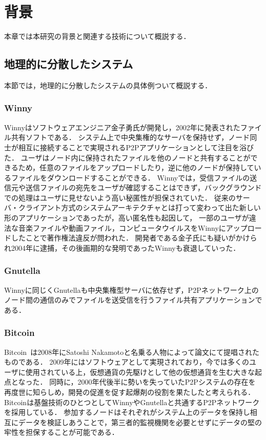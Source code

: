 \chapter{背景}
\label{background}

本章では本研究の背景と関連する技術について概説する．

\section{地理的に分散したシステム}
\label{background:geographically-disdtributed-system}
本節では，地理的に分散したシステムの具体例ついて概説する．

\subsection{Winny}
Winnyはソフトウェアエンジニア金子勇氏が開発し，2002年に発表されたファイル共有ソフトである．
システム上で中央集権的なサーバを保持せず，ノード同士が相互に接続することで実現されるP2Pアプリケーションとして注目を浴びた．
ユーザはノード内に保持されたファイルを他のノードと共有することができるため，任意のファイルをアップロードしたり，逆に他のノードが保持しているファイルをダウンロードすることができる．
Winnyでは，受信ファイルの送信元や送信ファイルの宛先をユーザが確認することはできず，バックグラウンドでの処理はユーザに見せないよう高い秘匿性が担保されていた．
従来のサーバ・クライアント方式のシステムアーキテクチャとは打って変わって出た新しい形のアプリケーションであったが，高い匿名性も起因して，
一部のユーザが違法な音楽ファイルや動画ファイル，コンピュータウイルスをWinnyにアップロードしたことで著作権法違反が問われた．
開発者である金子氏にも疑いがかけられ2004年に逮捕，その後画期的な発明であったWinnyも衰退していった．

\subsection{Gnutella}
Winnyに同じくGnutellaも中央集権型サーバに依存せず，P2Pネットワーク上のノード間の通信のみでファイルを送受信を行うファイル共有アプリケーションである．

\subsection{Bitcoin}
Bitcoin~\cite{Bitcoin}は2008年にSatoshi Nakamotoと名乗る人物によって論文にて提唱されたものである．
2009年にはソフトウェアとして実現されており，今では多くのユーザに使用されている上，仮想通貨の先駆けとして他の仮想通貨を生む大きな起点となった．
同時に，2000年代後半に勢いを失っていたP2Pシステムの存在を再度世に知らしめ，開発の促進を促す起爆剤の役割を果たしたと考えられる．
Bitcoinは基盤技術のひとつとしてWinnyやGnutellaと共通するP2Pネットワークを採用している．
参加するノードはそれぞれがシステム上のデータを保持し相互にデータを検証しあうことで，第三者的監視機関を必要とせずにデータの堅の牢性を担保することが可能である．

